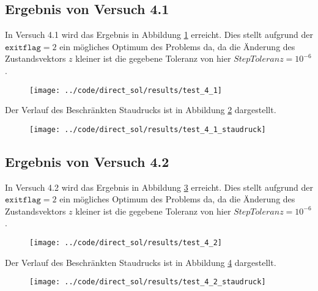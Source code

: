 \subsection{Ergebnis von Versuch 4.1}\label{kap:Versuch41}
In Versuch 4.1 wird das Ergebnis in Abbildung \ref{img:test_4_1} erreicht. Dies stellt aufgrund der $\texttt{exitflag} = 2$ ein mögliches Optimum des Problems da, da die Änderung des Zustandsvektors $z$ kleiner ist die gegebene Toleranz von hier $StepToleranz = 10^{-6}$.
\begin{figure}[H]
\begin{center}
\texttt{[image: ../code/direct\_sol/results/test\_4\_1]}
 \label{img:test_4_1}
\end{center}
\end{figure}
Der Verlauf des Beschränkten Staudrucks ist in Abbildung \ref{img:test_4_1_staudruck} dargestellt.
\begin{figure}[H]
\begin{center}
\texttt{[image: ../code/direct\_sol/results/test\_4\_1\_staudruck]}
\label{img:test_4_1_staudruck}
\end{center}
\end{figure}




\subsection{Ergebnis von Versuch 4.2}\label{kap:Versuch42}
In Versuch 4.2 wird das Ergebnis in Abbildung \ref{img:test_4_2} erreicht. Dies stellt aufgrund der $\texttt{exitflag} = 2$ ein mögliches Optimum des Problems da, da die Änderung des Zustandsvektors $z$ kleiner ist die gegebene Toleranz von hier $StepToleranz = 10^{-6}$.
\begin{figure}[H]
\begin{center}
\texttt{[image: ../code/direct\_sol/results/test\_4\_2]}
 \label{img:test_4_2}
\end{center}
\end{figure}
Der Verlauf des Beschränkten Staudrucks ist in Abbildung \ref{img:test_4_2_staudruck} dargestellt.
\begin{figure}[H]
\begin{center}
\texttt{[image: ../code/direct\_sol/results/test\_4\_2\_staudruck]}
\label{img:test_4_2_staudruck}
\end{center}
\end{figure}